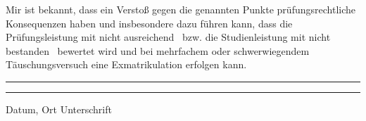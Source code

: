 \documentclass[a4paper,oneside, 11pt, openany%
]{article}
\theoremstyle{custom}
\theoremstyle{custom}
\begin{document}
		Mir ist bekannt, dass ein Verstoß gegen die genannten Punkte prüfungsrechtliche
		Konsequenzen haben und insbesondere dazu führen kann, dass die Prüfungsleistung mit
		\glqq nicht ausreichend\grqq~ bzw. die Studienleistung mit \glqq nicht bestanden\grqq~ bewertet wird und bei
		mehrfachem oder schwerwiegendem Täuschungsversuch eine Exmatrikulation erfolgen
		kann.
		\vspace{5cm}\\
		\noindent\rule{5cm}{.4pt}\hfill\rule{5cm}{.4pt}\par
		\noindent \hspace{12mm}Datum, Ort  \hspace{92mm}Unterschrift
\end{document}
